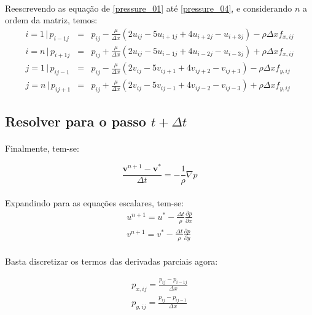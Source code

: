 \documentclass[poisson.tex]{subfiles}
\begin{document}
\paragraph{} Reescrevendo as equação de \ref{pressure_01} até \ref{pressure_04}, e considerando $n$ a ordem da matriz, temos:
\begin{eqnarray}
i=1 \,|\, p_{i-1j}&=&p_{ij}-\frac{\mu}{\Delta x}\left(2u_{ij}-5u_{i+1j}+4u_{i+2j}-u_{i+3j}\right)-\rho\Delta x f_{x,ij}\\
i=n \,|\, p_{i+1j}&=&p_{ij}+\frac{\mu}{\Delta x}\left(2u_{ij}-5u_{i-1j}+4u_{i-2j}-u_{i-3j}\right)+\rho\Delta x f_{x,ij}\\
j=1 \,|\, p_{ij-1}&=&p_{ij}-\frac{\mu}{\Delta x}\left(2v_{ij}-5v_{ij+1}+4v_{ij+2}-v_{ij+3}\right)-\rho\Delta x f_{y,ij}\\
j=n \,|\, p_{ij+1}&=&p_{ij}+\frac{\mu}{\Delta x}\left(2v_{ij}-5v_{ij-1}+4v_{ij-2}-v_{ij-3}\right)+\rho\Delta x f_{y,ij}
\end{eqnarray}
\subsection{Resolver para o passo $t+\Delta t$}
\paragraph{} Finalmente, tem-se: 

\begin{equation}
\frac{\textbf{v}^{n+1}-\textbf{v}^*}{\Delta t}=-\frac{1}{\rho}\nabla p
\end{equation}
\paragraph{} Expandindo para as equações escalares, tem-se:
\begin{eqnarray}
u^{n+1}=u^*-\frac{\Delta t}{\rho}\frac{\partial p}{\partial x}\\
v^{n+1}=v^*-\frac{\Delta t}{\rho}\frac{\partial p}{\partial y}
\end{eqnarray}
\paragraph{} Basta discretizar os termos das derivadas parciais agora:

\begin{eqnarray}
p_{x,ij}=\frac{p_{ij}-p_{i-1j}}{\Delta x}\\
p_{y,ij}=\frac{p_{ij}-p_{ij-1}}{\Delta x}
\end{eqnarray}
\end{document}
